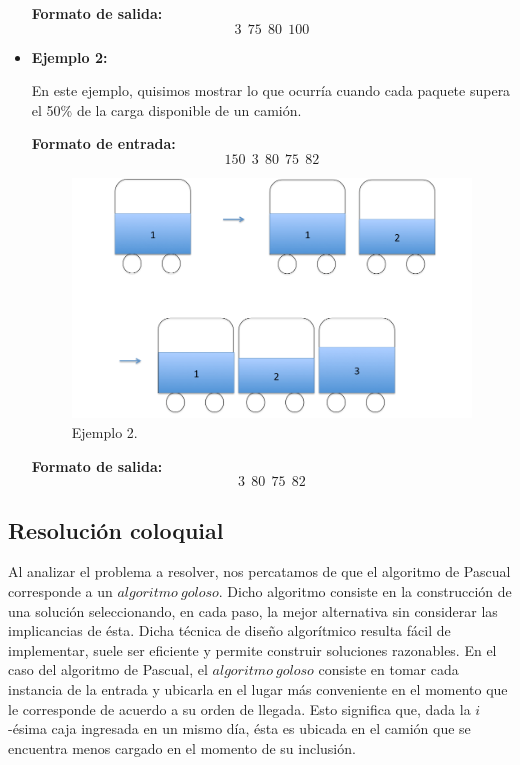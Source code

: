 \begin{itemize}
\textbf{Formato de salida:}
$$3\ \ 75\ \ 80\ \ 100$$


\item {\large{\textbf{Ejemplo 2:}}}\newline

En este ejemplo, quisimos mostrar lo que ocurría cuando cada paquete supera el 50\% de la carga disponible de un camión.\newline

\textbf{Formato de entrada:} 
$$150\ \ 3\ \ 80\ \ 75\ \ 82$$

\begin{figure}[H] %
\begin{center}
\includegraphics[width=300pt]{../imgs/ejemplo2.jpg}
\caption{Ejemplo 2.}
\end{center}
\end{figure}

\textbf{Formato de salida:}
$$3\ \ 80\ \ 75\ \ 82$$


\end{itemize}
\subsection{Resolución coloquial}
Al analizar el problema a resolver, nos percatamos de que el algoritmo de Pascual corresponde a un $algoritmo\ goloso$. Dicho algoritmo consiste en la construcción de una solución seleccionando, en cada paso, la mejor alternativa sin considerar las implicancias de ésta. Dicha técnica de diseño algorítmico resulta fácil de implementar, suele ser eficiente y permite construir soluciones razonables.\newline
\newline
En el caso del algoritmo de Pascual, el $algoritmo\ goloso$ consiste en tomar cada instancia de la entrada y ubicarla en el lugar más conveniente en el momento que le corresponde de acuerdo a su orden de llegada. Esto significa que, dada la $i$-ésima caja ingresada en un mismo día, ésta es ubicada en el camión que se encuentra menos cargado en el momento de su inclusión.\newline

